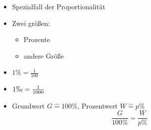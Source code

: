 \begin{itemize}
    \item Spezialfall der Proportionalität
    \item Zwei größen:\
    \begin{itemize}
        \item Prozente
        \item andere Größe
    \end{itemize}
    \item $1\% = \frac{1}{100}$
    \item $1\permil = \frac{1}{1000}$
    \item Grundwert $G \hat{=} 100\%$, Prozentwert $W \hat{=} p\%$
    \[\frac{G}{100\%} = \frac{W}{p\%}\]
\end{itemize}
